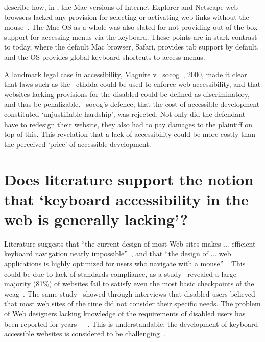 \documentclass[11pt,openright,a4paper]{report}
\begin{document}
\citeauthor{hendrix1997adapting} describe how, in \citeyear{hendrix1997adapting}, the Mac versions of Internet Explorer and Netscape web browsers lacked any provision for selecting or activating web links without the mouse~\cite{hendrix1997adapting}. The Mac OS as a whole was also slated for not providing out-of-the-box support for accessing menus via the keyboard. These points are in stark contrast to today, where the default Mac browser, Safari, provides tab support by default\cite{safaria11y}, and the OS provides global keyboard shortcuts to access menus\cite{macshortcuts}.

A landmark legal case in accessibility, Maguire v ~\gls{socog}~\cite{sloan2001web,russell2003access}, 2000, made it clear that laws such as the ~\gls{cthdda} could be used to enforce web accessibility, and that websites lacking provisions for the disabled could be defined as discriminatory, and thus be penalizable. ~\gls{socog}'s defence, that the cost of accessible development constituted `unjustifiable hardship', was rejected. Not only did the defendant have to redesign their website, they also had to pay damages to the plaintiff on top of this. This revelation that a lack of accessibility could be more costly than the perceived `price' of accessible development.
\section{Does literature support the notion that `keyboard accessibility in the web is generally lacking'?}
Literature suggests that ``the current design of most Web sites makes ... efficient keyboard navigation nearly impossible''~\parencite[][p.1]{schrepp2006efficiency}, and that ``the design of ... web applications is highly optimized for users who navigate with a mouse''~\parencite[][p.1]{schrepp2006efficiency}. This could be due to lack of standards-compliance, as a \citeyear{disability2004web} study~\cite{disability2004web} revealed a large majority (81\%) of websites fail to satisfy even the most basic checkpoints of the \gls{wcag}~\cite{chisholm2001web,wcag}. The same study~\cite{disability2004web} showed through interviews that disabled users believed that most web sites of the time did not consider their specific needs.
The problem of Web designers lacking knowledge of the requirements of disabled users has been reported for years~\cite{disability2004web}~\cite{coyne2001beyond}~\cite{velasco2001raising}. This is understandable; the development of keyboard-accessible websites is considered to be challenging~\cite{watanabe2012using}.
\end{document}
